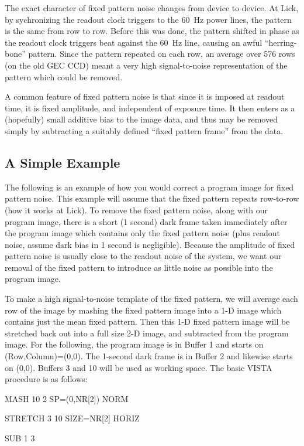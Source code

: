 The exact character of fixed pattern noise changes from device to device. At
Lick, by sychronizing the readout clock triggers to the 60~Hz power lines, the
pattern is the same from row to row.  Before this was done, the pattern
shifted in phase as the readout clock triggers beat against the 60~Hz line,
causing an awful ``herring-bone'' pattern.  Since the pattern repeated on each
row, an average over 576 rows (on the old GEC CCD) meant a very high
signal-to-noise representation of the pattern which could be removed. 

A common feature of fixed pattern noise is that since it is imposed at readout
time, it is fixed amplitude, and independent of exposure time.  It then enters
as a (hopefully) small additive bias to the image data, and thus may be
removed simply by subtracting a suitably defined ``fixed pattern frame'' from
the data. 

\subsection{A Simple Example}
\nobreak
The following is an example of how you would correct a program image for fixed
pattern noise.  This example will assume that the fixed pattern repeats
row-to-row (how it works at Lick).  To remove the fixed pattern noise, along
with our program image, there is a short (1 second) dark frame taken
immediately after the program image which contains only the fixed pattern
noise (plus readout noise, assume dark bias in 1 second is negligible).
Because the amplitude of fixed pattern noise is usually close to the readout
noise of the system, we want our removal of the fixed pattern to introduce as
little noise as possible into the program image. 

To make a high signal-to-noise template of the fixed pattern, we will average
each row of the image by mashing the fixed pattern image into a 1-D image
which contains just the mean fixed pattern.  Then this 1-D fixed pattern image
will be stretched back out into a full size 2-D image, and subtracted from the
program image.  For the following, the program image is in Buffer 1 and starts
on (Row,Column)=(0,0). The 1-second dark frame is in Buffer 2 and likewise
starts on (0,0). Buffers 3 and 10 will be used as working space.  The basic
VISTA procedure is as follows: 

\begin{command}
      \item MASH 10 2 SP=(0,NR[2]) NORM
      \item STRETCH 3 10 SIZE=NR[2] HORIZ
      \item SUB 1 3
\end{command}

